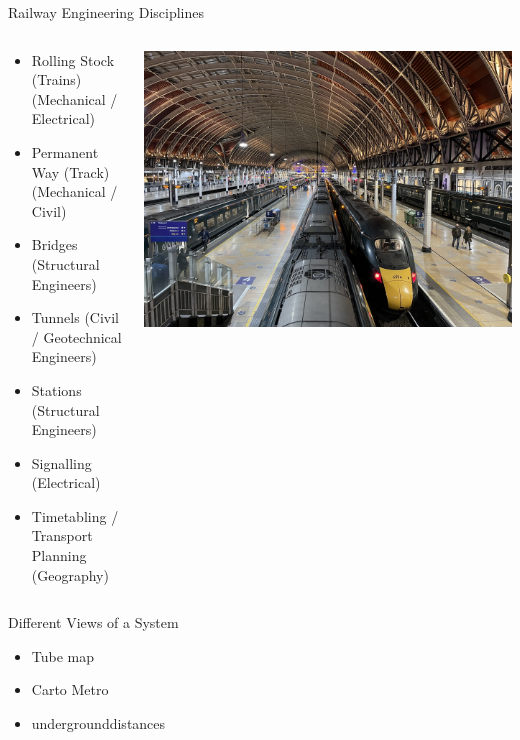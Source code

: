 \documentclass[
    aspectratio=169
]{beamer}
\begin{document}
\begin{frame}{Railway Engineering Disciplines}
	\begin{columns}[T] %
		\begin{column}{0.5\textwidth}
			\begin{itemize}
				\item Rolling Stock (Trains) (Mechanical / Electrical)
				\item Permanent Way (Track) (Mechanical / Civil)
				\item Bridges (Structural Engineers)
				\item Tunnels (Civil / Geotechnical Engineers)
				\item Stations (Structural Engineers)
				\item Signalling (Electrical)
				\item Timetabling / Transport Planning (Geography)
			\end{itemize}
		\end{column}
		
		\begin{column}{0.5\textwidth}
			\includegraphics[width=\textwidth]{images/station.jpg}
		\end{column}
	\end{columns}
	
\end{frame}

\begin{frame}{Different Views of a System}
	\begin{itemize}
		\item Tube map
		\item Carto Metro
		\item undergrounddistances
	\end{itemize}
\end{frame}
\end{document}
